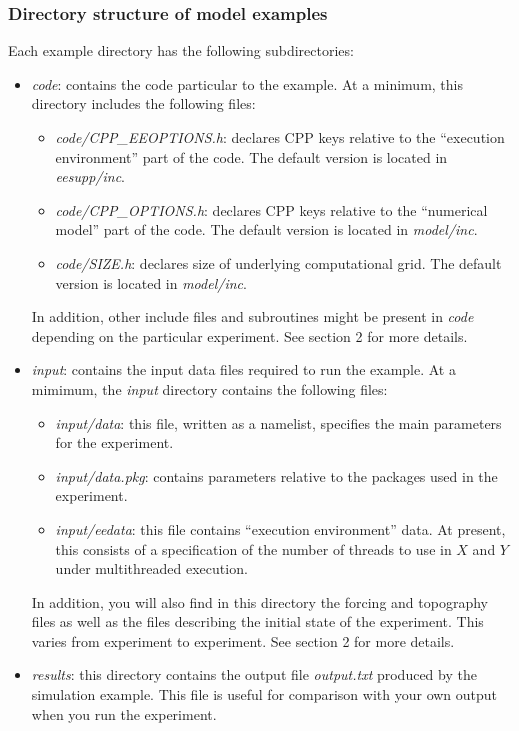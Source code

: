 \subsubsection{Directory structure of model examples}

Each example directory has the following subdirectories:

\begin{itemize}
\item \textit{code}: contains the code particular to the example. At a
minimum, this directory includes the following files:

\begin{itemize}
\item \textit{code/CPP\_EEOPTIONS.h}: declares CPP keys relative to the
``execution environment'' part of the code. The default version is located
in \textit{eesupp/inc}.

\item \textit{code/CPP\_OPTIONS.h}: declares CPP keys relative to the
``numerical model'' part of the code. The default version is located in 
\textit{model/inc}.

\item \textit{code/SIZE.h}: declares size of underlying computational grid.
The default version is located in \textit{model/inc}.
\end{itemize}

In addition, other include files and subroutines might be present in \textit{%
code} depending on the particular experiment. See section 2 for more details.

\item \textit{input}: contains the input data files required to run the
example. At a mimimum, the \textit{input} directory contains the following
files:

\begin{itemize}
\item \textit{input/data}: this file, written as a namelist, specifies the
main parameters for the experiment.

\item \textit{input/data.pkg}: contains parameters relative to the packages
used in the experiment.

\item \textit{input/eedata}: this file contains ``execution environment''
data. At present, this consists of a specification of the number of threads
to use in $X$ and $Y$ under multithreaded execution.
\end{itemize}

In addition, you will also find in this directory the forcing and topography
files as well as the files describing the initial state of the experiment.
This varies from experiment to experiment. See section 2 for more details.

\item \textit{results}: this directory contains the output file \textit{%
output.txt} produced by the simulation example. This file is useful for
comparison with your own output when you run the experiment.
\end{itemize}

